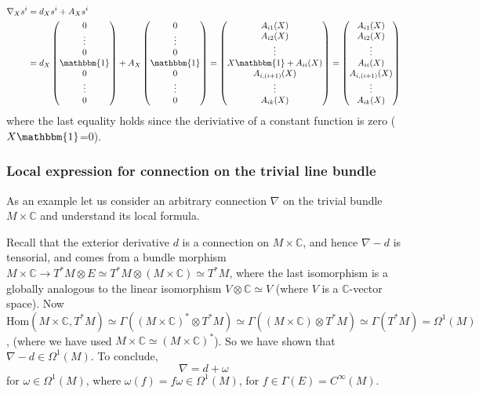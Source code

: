 \documentclass[a4paper]{article}
\theoremstyle{definition} \newtheorem*{definition}{Definition}
\theoremstyle{definition} \newtheorem*{definitions}{Definitions}
\theoremstyle{plain} \newtheorem{theorem}{Theorem}[section]
\theoremstyle{plain} \newtheorem{proposition}[theorem]{Proposition}
\theoremstyle{plain} \newtheorem{corollary}[theorem]{Corollary}
\theoremstyle{plain} \newtheorem{lemma}[theorem]{Lemma}
\theoremstyle{plain} \newtheorem{example}[theorem]{Example}
\newcommand{\complexnos}{\mathbb{C}}
\newcommand{\Hom}{\text{Hom}}
\newcommand{\smooth}{C^\infty}
\begin{document}
\begin{align*}
    \nabla_X s^i & = d_X s^i + A_X s^i \\
    & = d_X \begin{pmatrix}0 \\ \vdots \\ 0 \\ \mathbbm{1} \\ 0 \\ \vdots \\ 0\end{pmatrix} +
     A_X \begin{pmatrix}0 \\ \vdots \\ 0 \\ \mathbbm{1} \\ 0 \\ \vdots \\ 0\end{pmatrix} 
     = \begin{pmatrix}A_{i1}(X) \\ A_{i2}(X) \\ \vdots \\ X\mathbbm{1} + A_{ii}(X)\\ A_{i, (i+1)}(X) \\ \vdots \\ A_{ik}(X)\end{pmatrix} 
     = \begin{pmatrix}A_{i1}(X) \\ A_{i2}(X) \\ \vdots \\ A_{ii}(X)\\ A_{i, (i+1)}(X) \\ \vdots \\ A_{ik}(X)\end{pmatrix} 
\end{align*}
where the last equality holds since the deriviative of a constant function is zero ($X\mathbbm{1}$=0).

\subsubsection{Local expression for connection on the trivial line bundle}
As an example let us consider an arbitrary connection $\nabla$ on the trivial bundle $M\times \complexnos$ and understand its local formula. 

Recall that the exterior derivative $d$ is a connection on $M\times \complexnos$, and hence $\nabla - d$ is tensorial, and comes from a bundle morphism $M\times \complexnos\to T^*M\otimes E \simeq T^*M\otimes (M\times \complexnos)\simeq T^* M$, where the last isomorphism is a globally analogous to the linear isomorphism $V\otimes \complexnos\simeq V$ (where $V$ is a $\complexnos$-vector space). 
Now $\Hom(M\times \complexnos, T^*M)\simeq \Gamma((M\times \complexnos)^*\otimes T^*M)\simeq \Gamma((M\times \complexnos)\otimes T^*M) \simeq \Gamma(T^*M) = \Omega^1(M)$, (where we have used $M\times \complexnos \simeq (M\times \complexnos)^*$). So we have shown that $\nabla - d\in \Omega^1(M)$. To conclude,
$$\nabla = d + \omega$$
for $\omega \in \Omega^1(M)$, where $\omega(f)=f\omega \in \Omega^1(M)$, for $f\in \Gamma(E)=\smooth(M)$.
\end{document}
